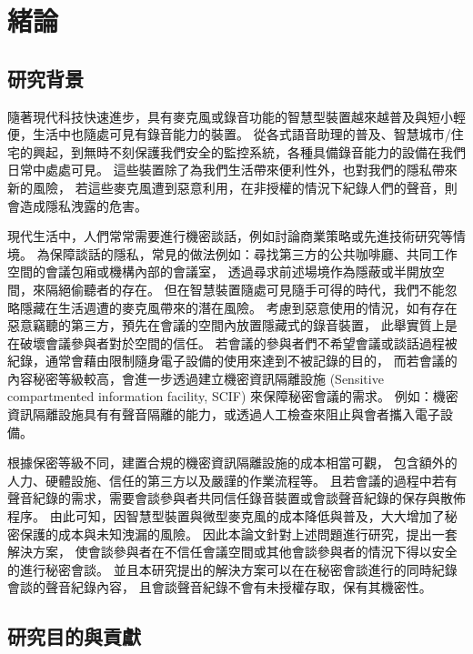 \chapter{緒論}\label{chapter:intro}

\section{研究背景}\label{section:intro-background}

    隨著現代科技快速進步，具有麥克風或錄音功能的智慧型裝置越來越普及與短小輕便，生活中也隨處可見有錄音能力的裝置。
從各式語音助理的普及、智慧城市/住宅的興起，到無時不刻保護我們安全的監控系統，各種具備錄音能力的設備在我們日常中處處可見。
這些裝置除了為我們生活帶來便利性外，也對我們的隱私帶來新的風險，
若這些麥克風遭到惡意利用，在非授權的情況下紀錄人們的聲音，則會造成隱私洩露的危害。

    現代生活中，人們常常需要進行機密談話，例如討論商業策略或先進技術研究等情境。
為保障談話的隱私，常見的做法例如：尋找第三方的公共咖啡廳、共同工作空間的會議包廂或機構內部的會議室，
透過尋求前述場境作為隱蔽或半開放空間，來隔絕偷聽者的存在。
但在智慧裝置隨處可見隨手可得的時代，我們不能忽略隱藏在生活週遭的麥克風帶來的潛在風險。
考慮到惡意使用的情況，如有存在惡意竊聽的第三方，預先在會議的空間內放置隱藏式的錄音裝置，
此舉實質上是在破壞會議參與者對於空間的信任。
若會議的參與者們不希望會議或談話過程被紀錄，通常會藉由限制隨身電子設備的使用來達到不被記錄的目的，
而若會議的內容秘密等級較高，會進一步透過建立機密資訊隔離設施
(Sensitive compartmented information facility, SCIF) 來保障秘密會議的需求。
例如：機密資訊隔離設施具有有聲音隔離的能力，或透過人工檢查來阻止與會者攜入電子設備。

    根據保密等級不同，建置合規的機密資訊隔離設施的成本相當可觀，
包含額外的人力、硬體設施、信任的第三方以及嚴謹的作業流程等。
且若會議的過程中若有聲音紀錄的需求，需要會談參與者共同信任錄音裝置或會談聲音紀錄的保存與散佈程序。
由此可知，因智慧型裝置與微型麥克風的成本降低與普及，大大增加了秘密保護的成本與未知洩漏的風險。
因此本論文針對上述問題進行研究，提出一套解決方案，
使會談參與者在不信任會議空間或其他會談參與者的情況下得以安全的進行秘密會談。
並且本研究提出的解決方案可以在在秘密會談進行的同時紀錄會談的聲音紀錄內容，
且會談聲音紀錄不會有未授權存取，保有其機密性。


\section{研究目的與貢獻}\label{section:intro-purpose}

